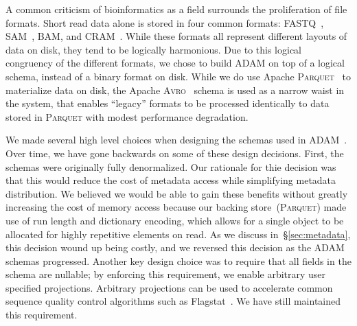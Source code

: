 \documentclass[phd]{ucbthesis}
\begin{document}
A common criticism of bioinformatics as a field surrounds the proliferation of file formats. Short read data alone is
stored in four common formats: \textsc{FASTQ}~\cite{cock10}, \textsc{SAM}~\cite{li09}, \textsc{BAM}, and
\textsc{CRAM}~\cite{fritz11}. While these formats all represent different layouts of data on disk, they tend to be
logically harmonious. Due to this logical congruency of the different formats, we chose to build \textsc{ADAM}
on top of a logical schema, instead of a binary format on disk. While we do use Apache \textsc{Parquet}~\cite{parquet} to
materialize data on disk, the Apache \textsc{Avro}~\cite{avro} schema is used as a narrow waist in the system,
that enables ``legacy'' formats to be processed identically to data stored in \textsc{Parquet} with modest performance
degradation.

We made several high level choices when designing the schemas used in
\textsc{ADAM}~\cite{massie13}. Over time, we have gone backwards on some of
these design decisions. First, the schemas were originally fully denormalized.
Our rationale for thie decision was that this would reduce the cost of metadata
access while simplifying metadata distribution. We believed we would be able to
gain these benefits without greatly increasing the cost of memory access because
our backing store~(\textsc{Parquet}) made use of run length and dictionary
encoding, which allows for a single object to be allocated for highly repetitive
elements on read. As we discuss in~\S\ref{sec:metadata}, this decision wound up
being costly, and we reversed this decision as the \textsc{ADAM} schemas
progressed. Another key design choice was to require that all fields in the
schema are nullable; by enforcing this requirement, we enable arbitrary user
specified projections. Arbitrary projections can be used to accelerate
common sequence quality control algorithms such as Flagstat~\cite{massie13,
  nothaft15}. We have still maintained this requirement.
\end{document}
